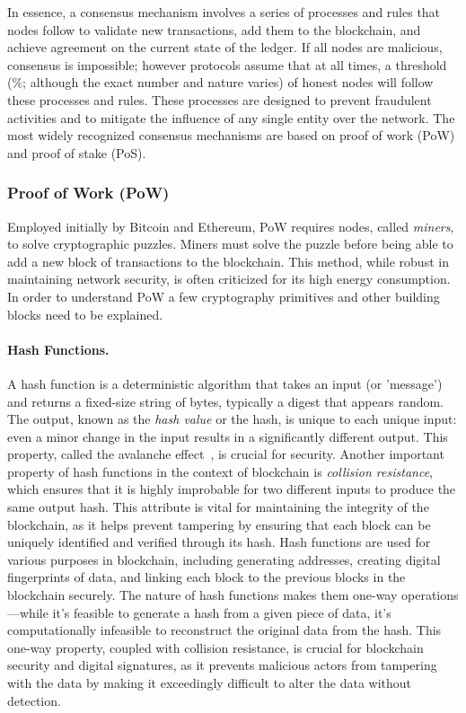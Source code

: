 In essence, a consensus mechanism involves a series of processes and rules that nodes follow to validate new transactions, add them to the blockchain, and achieve agreement on the current state of the ledger. If all nodes are malicious, consensus is impossible; however protocols assume that at all times, a threshold (\%; although the exact number and nature varies) of honest nodes will follow these processes and rules. These processes are designed to prevent fraudulent activities and to mitigate the influence of any single entity over the network. The most widely recognized consensus mechanisms are based on proof of work (PoW) and proof of stake (PoS).

\subsubsection{Proof of Work (PoW)} \label{pow}

Employed initially by Bitcoin and Ethereum, PoW requires nodes, called \textit{miners}, to solve cryptographic puzzles. Miners must solve the puzzle before being able to add a new block of transactions to the blockchain. This method, while robust in maintaining network security, is often criticized for its high energy consumption. In order to understand PoW a few cryptography primitives and other building blocks need to be explained.


\paragraph{Hash Functions.}
A hash function is a deterministic algorithm that takes an input (or 'message') and returns a fixed-size string of bytes, typically a digest that appears random. The output, known as the \textit{hash value} or the hash, is unique to each unique input: even a minor change in the input results in a significantly different output. This property, called the avalanche effect~\cite{feistel1973cryptography}, is crucial for security. Another important property of hash functions in the context of blockchain is \textit{collision resistance}, which ensures that it is highly improbable for two different inputs to produce the same output hash. This attribute is vital for maintaining the integrity of the blockchain, as it helps prevent tampering by ensuring that each block can be uniquely identified and verified through its hash. Hash functions are used for various purposes in blockchain, including generating addresses, creating digital fingerprints of data, and linking each block to the previous blocks in the blockchain securely. The nature of hash functions makes them one-way operations---while it's feasible to generate a hash from a given piece of data, it's computationally infeasible to reconstruct the original data from the hash. This one-way property, coupled with collision resistance, is crucial for blockchain security and digital signatures, as it prevents malicious actors from tampering with the data by making it exceedingly difficult to alter the data without detection.

